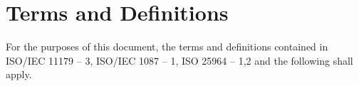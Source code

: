 \documentclass{article}
\begin{document}
%
%
%
%
%
%
%
%
%
%
%


\section{Terms and Definitions}

For the purposes of this document, the terms and definitions contained in ISO/IEC 11179 – 3, ISO/IEC 1087 – 1, ISO 25964 – 1,2 and the following shall apply.
\end{document}

